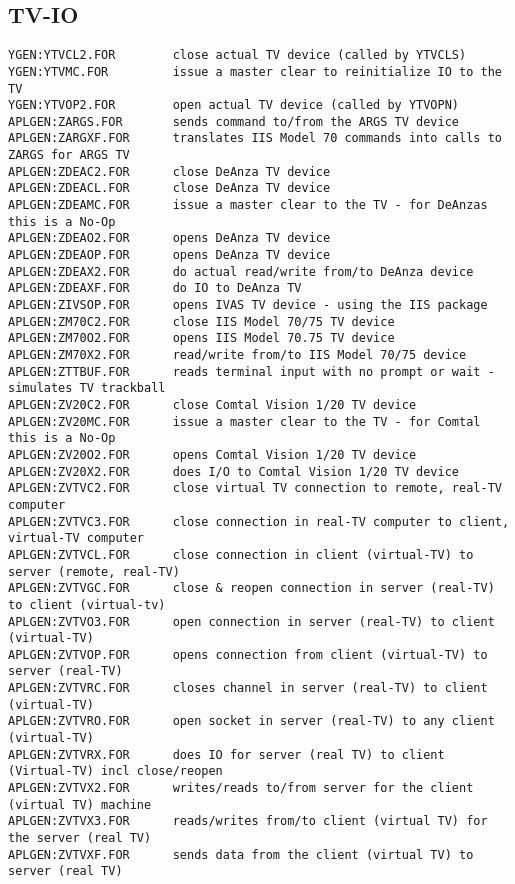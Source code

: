 \subsection{TV-IO}
\begin{verbatim}
YGEN:YTVCL2.FOR        close actual TV device (called by YTVCLS)
YGEN:YTVMC.FOR         issue a master clear to reinitialize IO to the TV
YGEN:YTVOP2.FOR        open actual TV device (called by YTVOPN)
APLGEN:ZARGS.FOR       sends command to/from the ARGS TV device
APLGEN:ZARGXF.FOR      translates IIS Model 70 commands into calls to ZARGS for ARGS TV
APLGEN:ZDEAC2.FOR      close DeAnza TV device
APLGEN:ZDEACL.FOR      close DeAnza TV device
APLGEN:ZDEAMC.FOR      issue a master clear to the TV - for DeAnzas this is a No-Op
APLGEN:ZDEAO2.FOR      opens DeAnza TV device
APLGEN:ZDEAOP.FOR      opens DeAnza TV device
APLGEN:ZDEAX2.FOR      do actual read/write from/to DeAnza device
APLGEN:ZDEAXF.FOR      do IO to DeAnza TV
APLGEN:ZIVSOP.FOR      opens IVAS TV device - using the IIS package
APLGEN:ZM70C2.FOR      close IIS Model 70/75 TV device
APLGEN:ZM70O2.FOR      opens IIS Model 70.75 TV device
APLGEN:ZM70X2.FOR      read/write from/to IIS Model 70/75 device
APLGEN:ZTTBUF.FOR      reads terminal input with no prompt or wait - simulates TV trackball
APLGEN:ZV20C2.FOR      close Comtal Vision 1/20 TV device
APLGEN:ZV20MC.FOR      issue a master clear to the TV - for Comtal this is a No-Op
APLGEN:ZV20O2.FOR      opens Comtal Vision 1/20 TV device
APLGEN:ZV20X2.FOR      does I/O to Comtal Vision 1/20 TV device
APLGEN:ZVTVC2.FOR      close virtual TV connection to remote, real-TV computer
APLGEN:ZVTVC3.FOR      close connection in real-TV computer to client, virtual-TV computer
APLGEN:ZVTVCL.FOR      close connection in client (virtual-TV) to server (remote, real-TV)
APLGEN:ZVTVGC.FOR      close & reopen connection in server (real-TV) to client (virtual-tv)
APLGEN:ZVTVO3.FOR      open connection in server (real-TV) to client (virtual-TV)
APLGEN:ZVTVOP.FOR      opens connection from client (virtual-TV) to server (real-TV)
APLGEN:ZVTVRC.FOR      closes channel in server (real-TV) to client (virtual-TV)
APLGEN:ZVTVRO.FOR      open socket in server (real-TV) to any client (virtual-TV)
APLGEN:ZVTVRX.FOR      does IO for server (real TV) to client (Virtual-TV) incl close/reopen
APLGEN:ZVTVX2.FOR      writes/reads to/from server for the client (virtual TV) machine
APLGEN:ZVTVX3.FOR      reads/writes from/to client (virtual TV) for the server (real TV)
APLGEN:ZVTVXF.FOR      sends data from the client (virtual TV) to server (real TV)
\end{verbatim}
 
